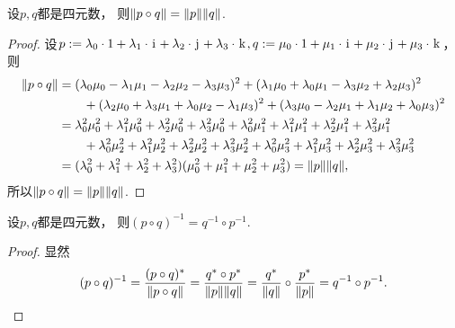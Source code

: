 \begin{property}
设\(p,q\)都是四元数，
则\(\norm{p \circ q} = \norm{p} \norm{q}\).
\begin{proof}
设\(
	p
	:=
	\lambda_0 \cdot 1
	+ \lambda_1 \cdot \kern1pt\mathrm{i}\kern1pt
	+ \lambda_2 \cdot \kern1pt\mathrm{j}\kern1pt
	+ \lambda_3 \cdot \kern1pt\mathrm{k}\kern1pt,
	q
	:=
	\mu_0 \cdot 1
	+ \mu_1 \cdot \kern1pt\mathrm{i}\kern1pt
	+ \mu_2 \cdot \kern1pt\mathrm{j}\kern1pt
	+ \mu_3 \cdot \kern1pt\mathrm{k}\kern1pt
\)，
则\begin{align*}
	\norm{p \circ q}
	&=
	(\lambda_0 \mu_0 - \lambda_1 \mu_1 - \lambda_2 \mu_2 - \lambda_3 \mu_3)^2
		+ (\lambda_1 \mu_0 + \lambda_0 \mu_1 - \lambda_3 \mu_2 + \lambda_2 \mu_3)^2 \\
	&\hspace{20pt}
		+ (\lambda_2 \mu_0 + \lambda_3 \mu_1 + \lambda_0 \mu_2 - \lambda_1 \mu_3)^2
		+ (\lambda_3 \mu_0 - \lambda_2 \mu_1 + \lambda_1 \mu_2 + \lambda_0 \mu_3)^2 \\
	&= \lambda_0^2 \mu_0^2
		+ \lambda_1^2 \mu_0^2
		+ \lambda_2^2 \mu_0^2
		+ \lambda_3^2 \mu_0^2
		+ \lambda_0^2 \mu_1^2
		+ \lambda_1^2 \mu_1^2
		+ \lambda_2^2 \mu_1^2
		+ \lambda_3^2 \mu_1^2 \\
	&\hspace{20pt}
		+ \lambda_0^2 \mu_2^2
		+ \lambda_1^2 \mu_2^2
		+ \lambda_2^2 \mu_2^2
		+ \lambda_3^2 \mu_2^2
		+ \lambda_0^2 \mu_3^2
		+ \lambda_1^2 \mu_3^2
		+ \lambda_2^2 \mu_3^2
		+ \lambda_3^2 \mu_3^2 \\
	&= (
		\lambda_0^2
		+ \lambda_1^2
		+ \lambda_2^2
		+ \lambda_3^2
	) (
		\mu_0^2
		+ \mu_1^2
		+ \mu_2^2
		+ \mu_3^2
	)
	= \norm{p} \norm{q},
\end{align*}
所以\(\norm{p \circ q} = \norm{p} \norm{q}\).
\end{proof}
\end{property}

\begin{property}
设\(p,q\)都是四元数，
则\((p \circ q)^{-1} = q^{-1} \circ p^{-1}\).
\begin{proof}
显然\begin{equation*}
	(p \circ q)^{-1}
	= \frac{(p \circ q)^*}{\norm{p \circ q}}
	= \frac{q^* \circ p^*}{\norm{p} \norm{q}}
	= \frac{q^*}{\norm{q}} \circ \frac{p^*}{\norm{p}}
	= q^{-1} \circ p^{-1}.
	\qedhere
\end{equation*}
\end{proof}
\end{property}


